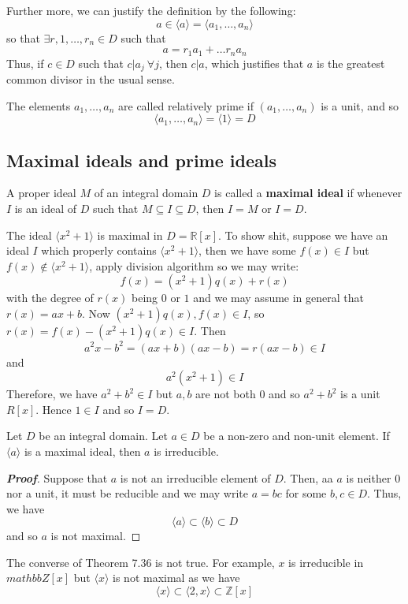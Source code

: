 Further more, we can justify the definition by the following:
$$a \in \langle a \rangle =\langle a_1,\ldots,a_n \rangle$$
so that $\exists r,1,\ldots,r_n \in D$ such that
$$a=r_1a_1+\ldots r_n a_n$$ Thus, if $c \in D$ such that $c|a_j~\forall j$, then $c|a$, which justifies that $a$ is the greatest common divisor in the usual sense.
\begin{definition} The elements $a_1,\ldots,a_n$ are called relatively prime if $(a_1,\ldots,a_n)$ is a unit, and so $$\langle a_1,\ldots,a_n \rangle = \langle 1 \rangle =D$$
\end{definition}
\subsection{Maximal ideals and prime ideals}
\begin{definition} A proper ideal $M$ of an integral domain $D$ is called a {\bf maximal ideal} if whenever $I$ is an ideal of $D$ such that $M \subseteq I \subseteq D$, then $I=M$ or $I=D$.
\end{definition}
\begin{example} The ideal $\langle x^2+1 \rangle$ is maximal in $D=\mathbb{R}[x]$. To show shit, suppose we have an ideal $I$ which properly contains $\langle x^2+1 \rangle$, then we have some $f(x) \in I$ but $f(x) \not \in \langle x^2+1 \rangle$, apply division algorithm so we may write:
$$f(x)=(x^2+1)q(x)+r(x)$$ with the degree of $r(x)$ being $0$ or $1$ and we may assume in general that
$r(x)=ax+b$. Now $(x^2+1)q(x),f(x) \in I$, so $r(x)=f(x)-(x^2+1)q(x) \in I$. Then
$$a^2x-b^2=(ax+b)(ax-b)=r(ax-b) \in I$$
and
$$a^2(x^2+1) \in I$$
Therefore, we have $a^2+b^2 \in I$ but $a,b$ are not both $0$ and so $a^2+b^2$ is a unit $R[x]$. Hence $1 \in I$ and so $I=D$.
\end{example}
\begin{theorem} Let $D$ be an integral domain. Let $a \in D$ be a non-zero and non-unit element. If $\langle a\rangle$ is a maximal ideal, then $a$ is irreducible.
\end{theorem}
\begin{proof}[\bf Proof] Suppose that $a$ is not an irreducible element of $D$. Then, aa $a$ is neither $0$ nor a unit, it must be reducible and we may write $a=bc$ for some $b,c \in D$. Thus, we have
$$\langle a \rangle \subset \langle b \rangle \subset D$$
and so $a$ is not maximal.
\end{proof}
\begin{remark} The converse of Theorem 7.36 is not true. For example, $x$ is irreducible in $mathbb{Z}[x]$ but $\langle x \rangle$ is not maximal as we have
$$\langle x \rangle \subset \langle 2,x \rangle \subset \mathbb{Z}[x]$$
\end{remark}
